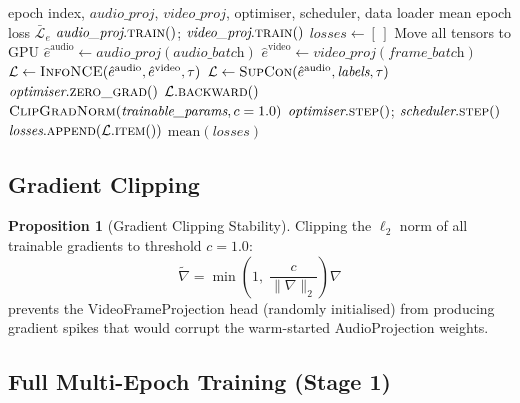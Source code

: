 \documentclass[12pt,a4paper]{article}
\theoremstyle{definition}
\newtheorem{proposition}[theorem]{Proposition}
\theoremstyle{remark}
\begin{document}
\begin{algorithm}[H]
\caption{Single-Epoch Training (Cross-Modal InfoNCE)}
\label{alg:train_epoch}
\begin{algorithmic}[1]
\Require epoch index, $\textit{audio\_proj}$, $\textit{video\_proj}$,
         optimiser, scheduler, data loader
\Ensure mean epoch loss $\bar{\mathcal{L}}_e$
\State $\textit{audio\_proj}.\textsc{train}()$; $\textit{video\_proj}.\textsc{train}()$
\State $\textit{losses} \gets [\,]$
  \State Move all tensors to GPU
  \State $\hat{e}^{\text{audio}} \gets \textit{audio\_proj}(\textit{audio\_batch})$
    \State $\hat{e}^{\text{video}} \gets \textit{video\_proj}(\textit{frame\_batch})$
    \State $\mathcal{L} \gets \textsc{InfoNCE}(\hat{e}^{\text{audio}}, \hat{e}^{\text{video}}, \tau)$
  \Else
    \State $\mathcal{L} \gets \textsc{SupCon}(\hat{e}^{\text{audio}}, \textit{labels}, \tau)$
  \EndIf
  \State $\textit{optimiser}.\textsc{zero\_grad}()$
  \State $\mathcal{L}.\textsc{backward}()$
  \State $\textsc{ClipGradNorm}(\textit{trainable\_params}, c=1.0)$
  \State $\textit{optimiser}.\textsc{step}()$; $\textit{scheduler}.\textsc{step}()$
  \State $\textit{losses}.\textsc{append}(\mathcal{L}.\textsc{item}())$
\EndFor
\State \Return $\text{mean}(\textit{losses})$
\end{algorithmic}
\end{algorithm}

\subsection{Gradient Clipping}

\begin{proposition}[Gradient Clipping Stability]
Clipping the $\ell_2$ norm of all trainable gradients to threshold $c=1.0$:
\[
  \tilde\nabla = \min\!\left(1,\; \frac{c}{\|\nabla\|_2}\right)\nabla
\]
prevents the VideoFrameProjection head (randomly initialised) from producing
gradient spikes that would corrupt the warm-started AudioProjection weights.
\end{proposition}

\subsection{Full Multi-Epoch Training (Stage 1)}
\end{document}
